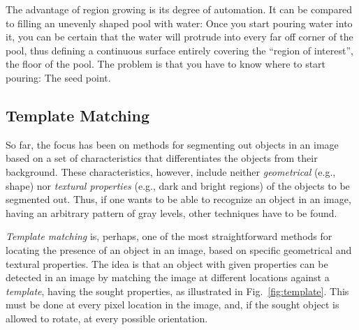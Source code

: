 The advantage of region growing is its degree of automation.  It can
be compared to filling an unevenly shaped pool with water: Once you
start pouring water into it, you can be certain that the water will
protrude into every far off corner of the pool, thus defining a
continuous surface entirely covering the ``region of interest'', the
floor of the pool.  The problem is that you have to know where to
start pouring: The seed point.

\subsection{Template Matching}
\label{image:segment:template}

So far, the focus has been on methods for segmenting out objects in an
image based on a set of characteristics that differentiates the
objects from their background.  These characteristics, however,
include neither {\em geometrical\/} (e.g., shape) nor {\em textural
  properties\/} (e.g., dark and bright regions) of the objects to be
segmented out.  Thus, if one wants to be able to recognize an object
in an image, having an arbitrary pattern of gray levels, other
techniques have to be found.

{\em Template matching\/} is, perhaps, one of the most straightforward
methods for locating the presence of an object in an image, based on
specific geometrical and textural properties.  The idea is that an
object with given properties can be detected in an image by matching
the image at different locations against a {\em template\/}, having
the sought properties, as illustrated in Fig.~\ref{fig:template}.
This must be done at every pixel location in the image, and, if the
sought object is allowed to rotate, at every possible orientation.



